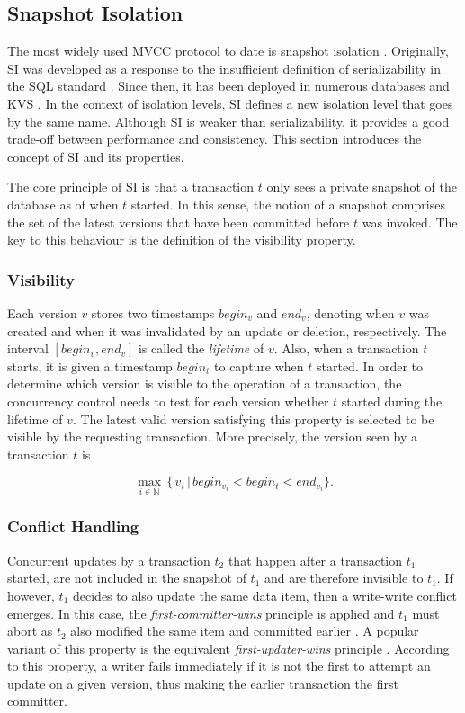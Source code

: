 \subsection{Snapshot Isolation}

The most widely used MVCC protocol to date is snapshot isolation
\cite{larson2011high, neumann2015fast}. Originally, SI was developed as a
response to the insufficient definition of serializability in the SQL standard
\cite{berenson1995critique}. Since then, it has been deployed in numerous
databases and KVS \cite{cahill2009serializable, wu2017empirical}. In the context
of isolation levels, SI defines a new isolation level that goes by the same
name. Although SI is weaker than serializability, it provides a good trade-off
between performance and consistency. This section introduces the concept of SI
and its properties.

The core principle of SI is that a transaction $t$ only sees a private snapshot
of the database as of when $t$ started. In this sense, the notion of a snapshot
comprises the set of the latest versions that have been committed before $t$ was
invoked. The key to this behaviour is the definition of the visibility property.

\subsubsection{Visibility}

Each version $v$ stores two timestamps $begin_v$ and $end_v$, denoting when $v$
was created and when it was invalidated by an update or deletion, respectively.
The interval $[begin_v,  end_v]$ is called the \emph{lifetime} of $v$. Also,
when a transaction $t$ starts, it is given a timestamp $begin_t$ to capture when
$t$ started. In order to determine which version is visible to the operation of
a transaction, the concurrency control needs to test for each version whether
$t$ started during the lifetime of $v$. The latest valid version satisfying this
property is selected to be visible by the requesting transaction. More
precisely, the version seen by a transaction $t$ is

\[
\operatorname*{max}_{i \in \mathbb{N}}\, \{\, v_i\, |\, begin_{v_i} < begin_t < end_{v_i}\}.
\]

\subsubsection{Conflict Handling}

Concurrent updates by a transaction $t_2$ that happen after a transaction $t_1$
started, are not included in the snapshot of $t_1$ and are therefore invisible
to $t_1$. If however, $t_1$ decides to also update the same data item, then a
write-write conflict emerges. In this case, the \emph{first-committer-wins}
principle is applied and $t_1$ must abort as $t_2$ also modified the same item
and committed earlier \cite{berenson1995critique}. A popular variant of this
property is the equivalent \emph{first-updater-wins} principle
\cite{fekete2004read, larson2011high}. According to this property, a writer
fails immediately if it is not the first to attempt an update on a given
version, thus making the earlier transaction the first committer.

